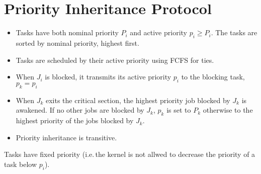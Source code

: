 \section{Priority Inheritance Protocol}
\begin{itemize}
	\item Tasks have both nominal priority $P_i$ and active priority $p_i \geq P_i$.
		The tasks are sorted by nominal priority, highest first.
	\item Tasks are scheduled by their active priority using FCFS for ties.
	\item When $J_i$ is blocked, it transmits its active priority $p_i$ to the
		blocking task, $p_k = p_i$
	\item When $J_k$ exits the critical section, the highest priority job
		blocked by $J_k$ is awakened. If no other jobs are blocked by $J_k$,
		$p_k$ is set to $P_k$ otherwise to the highest priority of the jobs
		blocked by $J_k$.
	\item Priority inheritance is transitive.
\end{itemize}

Tasks have fixed priority (i.e.\,the kernel is not allwed to decrease the
priority of a task below $p_i$).
